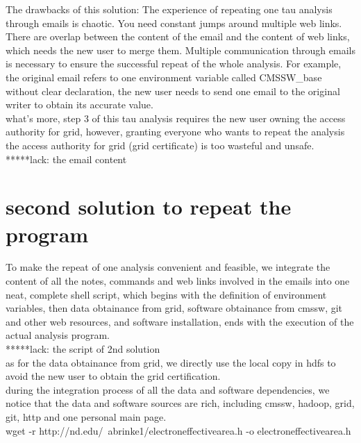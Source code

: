 \documentclass{article}
\begin{document}
The drawbacks of this solution: The experience of repeating one tau analysis through emails is chaotic. You need constant jumps around multiple web links. There are overlap between the content of the email and the content of web links, which needs the new user to merge them. Multiple communication through emails is necessary to ensure the successful repeat of the whole analysis. For example, the original email refers to one environment variable called CMSSW\_base without clear declaration, the new user needs to send one email to the original writer to obtain its accurate value.\\

what’s more, step 3 of this tau analysis requires the new user owning the access authority for grid, however, granting  everyone who wants to repeat the analysis the access authority for grid (grid certificate) is too wasteful and unsafe. \\

*****lack: the email content\\

\section{second solution to repeat the program}
\indent To make the repeat of one analysis convenient and feasible, we integrate the content of all the notes, commands and web links involved in the emails into one neat, complete shell script, which begins with the definition of environment variables, then data obtainance from grid, software obtainance from cmssw, git and other web resources, and software installation, ends with the execution of the actual analysis program.\\

*****lack: the script of 2nd solution \\

as for the data obtainance from grid, we directly use the local copy in hdfs to avoid the new user to obtain the grid certification.\\

during the integration process of all the data and software dependencies, we notice that the data and software sources are rich, including cmssw, hadoop, grid, git, http and one personal main page. \\
wget -r http://nd.edu/~abrinke1/electroneffectivearea.h -o electroneffectivearea.h\\ 
\end{document}
